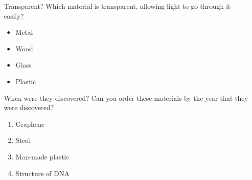 \documentclass[a4paper, 12pt]{article}
\begin{document}
	\newpage
	\begin{question}[]{Transparent?}
		Which material is transparent, allowing light to go through it easily?
		\begin{itemize}
  		\centering
  			\item Metal
  			\item Wood
  			\item Glass
  			\item Plastic
  		\end{itemize}
	\end{question}
	\begin{question}[colback=orange!10]{When were they discovered?}
		Can you order these materials by the year that they were discovered?
		\begin{enumerate}
  		\centering
  			\item Graphene %
  			\item Steel %
  			\item Man-made plastic %
  			\item Structure of DNA %
  		\end{enumerate}
	\end{question}
\end{document}
